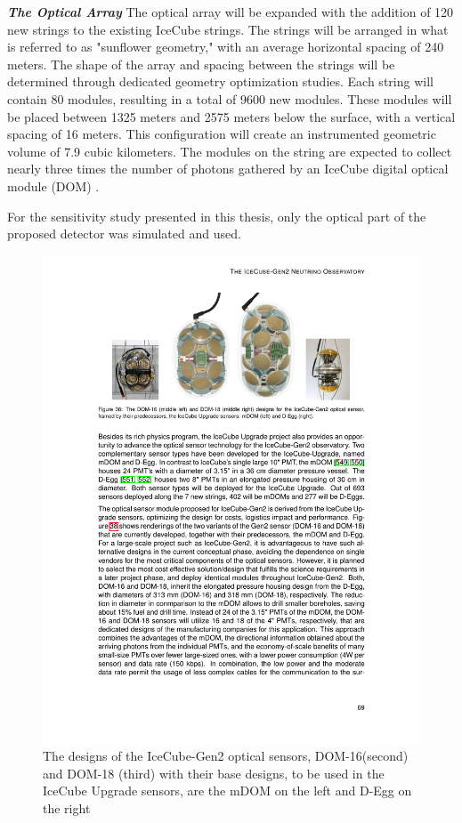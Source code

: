 \begin{description}
    \item \textbf{\emph{The Optical Array}} The optical array will be expanded with the addition of 120 new strings to the existing IceCube strings. The strings will be arranged in what is referred to as "sunflower geometry," with an average horizontal spacing of 240 meters. The shape of the array and spacing between the strings will be determined through dedicated geometry optimization studies. Each string will contain 80 modules, resulting in a total of 9600 new modules. These modules will be placed between 1325 meters and 2575 meters below the surface, with a vertical spacing of 16 meters. This configuration will create an instrumented geometric volume of 7.9 cubic kilometers. The modules on the string are expected to collect nearly three times the number of photons gathered by an IceCube digital optical module (DOM) .
\end{description}

For the sensitivity study presented in this thesis, only the optical part of the proposed detector was simulated and used. 

\begin{figure}
	\includegraphics[scale=2.2]{./figures/gen2/Gen2_DOMs.pdf}
	\caption[Designs of candidate optical modules for IceCube-Gen2]{The designs of the IceCube-Gen2 optical sensors, DOM-16(second) and DOM-18 (third) with their base designs, to be used in the IceCube Upgrade sensors, are the mDOM on the left and D-Egg on the right \cite{Gen2_TDR}}
\end{figure}

